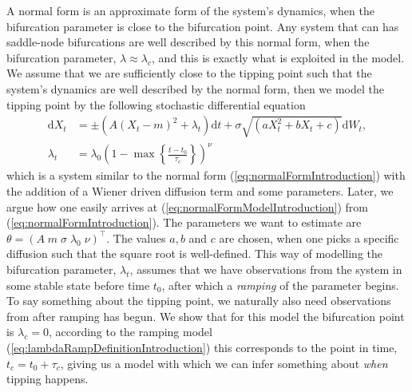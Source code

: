A normal form is an approximate form of the system's dynamics, when the bifurcation parameter is close to the bifurcation point. Any system that can has saddle-node bifurcations are well described by this normal form, when the bifurcation parameter, $\lambda\approx\lambda_c$, and this is exactly what is exploited in the model. We assume that we are sufficiently close to the tipping point such that the system's dynamics are well described by the normal form, then we model the tipping point by the following stochastic differential equation
\begin{align}
    \mathrm{d}X_t &= \pm(A(X_t - m)^2 + \lambda_t)\mathrm{d}t + \sigma\sqrt{\left(aX_t^2 + bX_t + c\right)}\mathrm{d}W_t, \label{eq:normalFormModelIntroduction}\\
    \lambda_t &= \lambda_0\left(1 - \max\left\{\frac{t - t_0}{\tau_c}\right\}\right)^\nu \label{eq:lambdaRampDefinitionIntroduction}
\end{align}
which is a system similar to the normal form (\ref{eq:normalFormIntroduction}) with the addition of a Wiener driven diffusion term and some parameters. Later, we argue how one easily arrives at (\ref{eq:normalFormModelIntroduction}) from (\ref{eq:normalFormIntroduction}). The parameters we want to estimate are $\theta = \left(A\; m\; \sigma\; \lambda_0\; \nu\right)^\top$. The values $a, b$ and $c$ are chosen, when one picks a specific diffusion such that the square root is well-defined. This way of modelling the bifurcation parameter, $\lambda_t$, assumes that we have observations from the system in some stable state before time $t_0$, after which a \textit{ramping} of the parameter begins. To say something about the tipping point, we naturally also need observations from after ramping has begun. We show that for this model the bifurcation point is $\lambda_c = 0$, according to the ramping model (\ref{eq:lambdaRampDefinitionIntroduction}) this corresponds to the point in time, $t_c = t_0 + \tau_c$, giving us a model with which we can infer something about \textit{when} tipping happens.


